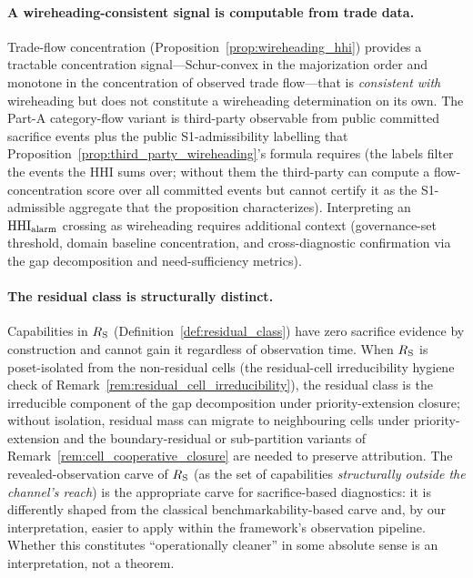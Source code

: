 \paragraph{A wireheading-consistent signal is computable from
trade data.}
Trade-flow concentration
(Proposition~\ref{prop:wireheading_hhi}) provides a tractable
concentration signal---Schur-convex in the majorization order
and monotone in the concentration of observed trade flow---that
is \emph{consistent with} wireheading but does not constitute a
wireheading determination on its own.  The Part-A category-flow
variant is third-party observable from public committed
sacrifice events plus the public S1-admissibility labelling
that Proposition~\ref{prop:third_party_wireheading}'s formula
requires (the labels filter the events the HHI sums over;
without them the third-party can compute a flow-concentration
score over all committed events but cannot certify it as the
S1-admissible aggregate that the proposition characterizes).  Interpreting
an $\mathrm{HHI}_{\mathrm{alarm}}$ crossing as wireheading requires
additional context (governance-set threshold, domain baseline
concentration, and cross-diagnostic confirmation via the gap
decomposition and need-sufficiency metrics).

\paragraph{The residual class is structurally distinct.}
Capabilities in $R_{\mathrm{S}}$
(Definition~\ref{def:residual_class}) have zero sacrifice
evidence by construction and cannot gain it regardless of
observation time.  When $R_{\mathrm{S}}$ is poset-isolated from the
non-residual cells (the residual-cell irreducibility hygiene
check of Remark~\ref{rem:residual_cell_irreducibility}), the
residual class is the irreducible component of the gap
decomposition under priority-extension closure; without
isolation, residual mass can migrate to neighbouring cells
under priority-extension and the boundary-residual or
sub-partition variants of
Remark~\ref{rem:cell_cooperative_closure} are needed to
preserve attribution.  The revealed-observation carve of
$R_{\mathrm{S}}$ (as the set of capabilities \emph{structurally outside
the channel's reach}) is the appropriate carve for
sacrifice-based diagnostics: it is differently shaped from the
classical benchmarkability-based carve and, by our
interpretation, easier to apply within the framework's
observation pipeline.  Whether this constitutes ``operationally
cleaner'' in some absolute sense is an interpretation, not a
theorem.

